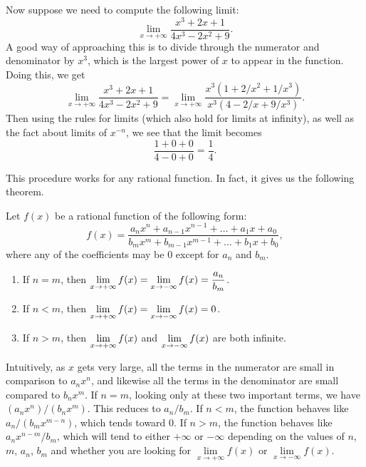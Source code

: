 Now suppose we need to compute the following limit:
$$\lim_{x\rightarrow+\infty}\frac{x^3+2x+1}{4x^3-2x^2+9}.$$
A good way of approaching this is to divide through the numerator and denominator by $x^3$, which is the largest power of $x$ to appear in the function.  Doing this, we get
$$
\lim_{x\rightarrow+\infty}\frac{x^3+2x+1}{4x^3-2x^2+9} = \lim_{x\rightarrow+\infty}\frac{x^3\left(1+2/x^2+1/x^3\right)}{x^3\left(4-2/x+9/x^3\right)}.
$$
Then using the rules for limits (which also hold for limits at infinity), as well as the fact about limits of $x^{-n}$, we see that the limit becomes
$$\frac{1+0+0}{4-0+0}=\frac14.$$

This procedure works for any rational function.  In fact, it gives us the following theorem.

\begin{theorem}\label{thm:lim_rational_fn_at_infty}
Let $f(x)$ be a rational function of the following form:
$$f(x)=\frac{a_nx^n + a_{n-1}x^{n-1}+\dots + a_1x + a_0}{b_mx^m + b_{m-1}x^{m-1} + \dots + b_1x + b_0},$$
where any of the coefficients may be 0 except for $a_n$ and $b_m$.
\begin{enumerate}
\item If $n=m$, then $\displaystyle\lim_{x\rightarrow+\infty} f(x) = \lim_{x\rightarrow-\infty} f(x) = \frac{a_n}{b_m}$.
\item If $n<m$, then $\displaystyle\lim_{x\rightarrow+\infty} f(x) = \lim_{x\rightarrow-\infty} f(x) = 0$.
\item If $n>m$, then $\displaystyle\lim_{x\rightarrow+\infty} f(x)$ and $\displaystyle\lim_{x\rightarrow-\infty} f(x)$ are both infinite.
\end{enumerate}
\end{theorem}
Intuitively, as $x$ gets very large, all the terms in the numerator are small in comparison to $a_nx^n$, and likewise all the terms in the denominator are small compared to $b_nx^m$.  If $n=m$, looking only at these two important terms, we have $(a_nx^n)/(b_nx^m)$.  This reduces to $a_n/b_m$.  If $n<m$, the function behaves like $a_n/(b_mx^{m-n})$, which tends toward 0.  If $n>m$, the function behaves like $a_nx^{n-m}/b_m$, which will tend to either $+\infty$ or $-\infty$ depending on the values of $n$, $m$, $a_n$, $b_m$ and whether you are looking for $\lim\limits_{x\rightarrow+\infty} f(x)$ or $\lim\limits_{x\rightarrow-\infty} f(x)$.

